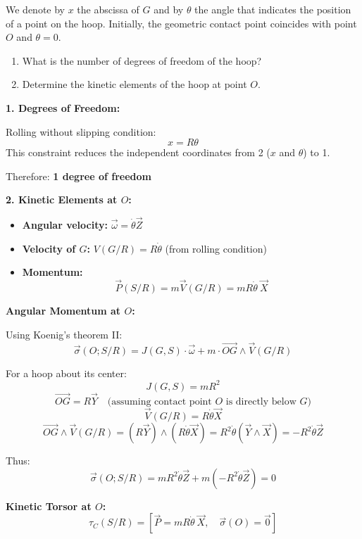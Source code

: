 \documentclass[12pt]{article}
\begin{document}
We denote by $x$ the abscissa of $G$ and by $\theta$ the angle that indicates the position of a point on the hoop. Initially, the geometric contact point coincides with point $O$ and $\theta = 0$.

\begin{enumerate}
    \item What is the number of degrees of freedom of the hoop?
    \item Determine the kinetic elements of the hoop at point $O$.
\end{enumerate}

\begin{correctionbox}
\textbf{1. Degrees of Freedom:}

Rolling without slipping condition:
\[
x = R \theta
\]
This constraint reduces the independent coordinates from 2 ($x$ and $\theta$) to 1.

Therefore: \textbf{1 degree of freedom}

\textbf{2. Kinetic Elements at $O$:}

\begin{itemize}
    \item \textbf{Angular velocity:} $\vec{\omega} = \dot{\theta} \vec{Z}$
    \item \textbf{Velocity of $G$:} $V(G/R) = R \dot{\theta}$ (from rolling condition)
    \item \textbf{Momentum:}
    \[
    \vec{P}(S/R) = m \vec{V}(G/R) = m R \dot{\theta} \ \vec{X}
    \]
\end{itemize}

\textbf{Angular Momentum at $O$:}

Using Koenig's theorem II:
\[
\vec{\sigma}(O; S/R) = J(G, S) \cdot \vec{\omega} + m \cdot \vec{OG} \wedge \vec{V}(G/R)
\]

For a hoop about its center:
\[
J(G, S) = m R^2
\]
\[
\vec{OG} = R \vec{Y} \quad \text{(assuming contact point $O$ is directly below $G$)}
\]
\[
\vec{V}(G/R) = R \dot{\theta} \vec{X}
\]
\[
\vec{OG} \wedge \vec{V}(G/R) = (R \vec{Y}) \wedge (R \dot{\theta} \vec{X}) = R^2 \dot{\theta} (\vec{Y} \wedge \vec{X}) = -R^2 \dot{\theta} \vec{Z}
\]

Thus:
\[
\vec{\sigma}(O; S/R) = m R^2 \dot{\theta} \vec{Z} + m (-R^2 \dot{\theta} \vec{Z}) = 0
\]

\textbf{Kinetic Torsor at $O$:}
\[
\tau_C(S/R) = \left[ \vec{P} = m R \dot{\theta} \ \vec{X},\quad \vec{\sigma}(O) = \vec{0} \right]
\]
\end{correctionbox}
\end{document}
